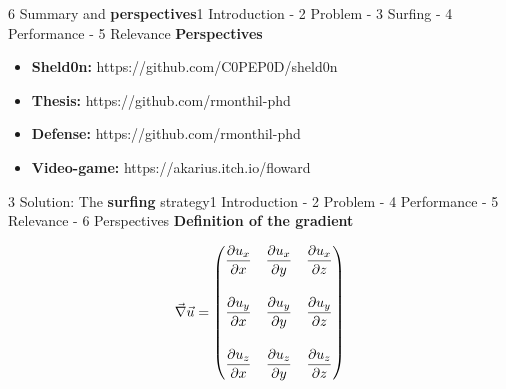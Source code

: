 \begin{frame}{6 Summary and \textbf{perspectives}}{1 Introduction - 2 Problem - 3 Surfing - 4 Performance - 5 Relevance}
	\centering
	\vspace{5pt}
	\textbf{\Large Perspectives}

	\vspace{15pt}
	\centering
	\leavevmode\hidewidth{}\hidewidth\null

	\vspace{0pt}
	\centering
	\begin{multicols}{2}
		\begin{itemize}
			\scriptsize
			\setlength\itemsep{2pt}
			\item \textbf{Sheld0n:} https://github.com/C0PEP0D/sheld0n
			\item \textbf{Thesis:} https://github.com/rmonthil-phd
			\item \textbf{Defense:} https://github.com/rmonthil-phd
			\item \textbf{Video-game:} https://akarius.itch.io/floward
		\end{itemize}
	\end{multicols}
\end{frame}


\begin{frame}[noframenumbering]{3 Solution: The \textbf{surfing} strategy}{1 Introduction - 2 Problem - 4 Performance - 5 Relevance - 6 Perspectives}
	\centering
	\textbf{\Large Definition of the gradient}

	\Large
	\begin{center}
		\begin{equation*}
			\vec{\nabla} \vec{u} = \begin{pmatrix}
				\displaystyle \frac{\partial u_x}{\partial x} & \displaystyle \frac{\partial u_x}{\partial y} & \displaystyle \frac{\partial u_x}{\partial z} \\[20pt]
				\displaystyle \frac{\partial u_y}{\partial x} & \displaystyle \frac{\partial u_y}{\partial y} & \displaystyle \frac{\partial u_y}{\partial z} \\[20pt]
				\displaystyle \frac{\partial u_z}{\partial x} & \displaystyle \frac{\partial u_z}{\partial y} & \displaystyle \frac{\partial u_z}{\partial z}
			\end{pmatrix}
		\end{equation*}
	\end{center}
\end{frame}

